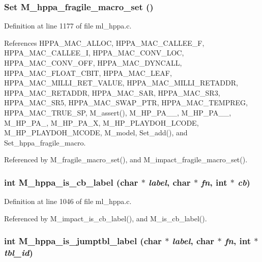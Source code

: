 \subsubsection{\setlength{\rightskip}{0pt plus 5cm}\bf{Set} M\_\-hppa\_\-fragile\_\-macro\_\-set ()}\label{ml__hppa_8c_edcedf3decd672a9794788983658d9de}




Definition at line 1177 of file ml\_\-hppa.c.

References HPPA\_\-MAC\_\-ALLOC, HPPA\_\-MAC\_\-CALLEE\_\-F, HPPA\_\-MAC\_\-CALLEE\_\-I, HPPA\_\-MAC\_\-CONV\_\-LOC, HPPA\_\-MAC\_\-CONV\_\-OFF, HPPA\_\-MAC\_\-DYNCALL, HPPA\_\-MAC\_\-FLOAT\_\-CBIT, HPPA\_\-MAC\_\-LEAF, HPPA\_\-MAC\_\-MILLI\_\-RET\_\-VALUE, HPPA\_\-MAC\_\-MILLI\_\-RETADDR, HPPA\_\-MAC\_\-RETADDR, HPPA\_\-MAC\_\-SAR, HPPA\_\-MAC\_\-SR3, HPPA\_\-MAC\_\-SR5, HPPA\_\-MAC\_\-SWAP\_\-PTR, HPPA\_\-MAC\_\-TEMPREG, HPPA\_\-MAC\_\-TRUE\_\-SP, M\_\-assert(), M\_\-HP\_\-PA\_\_, M\_\-HP\_\-PA\_\_, M\_\-HP\_\-PA\_, M\_\-HP\_\-PA\_\-X, M\_\-HP\_\-PLAYDOH\_\-LCODE, M\_\-HP\_\-PLAYDOH\_\-MCODE, M\_\-model, Set\_\-add(), and Set\_\-hppa\_\-fragile\_\-macro.

Referenced by M\_\-fragile\_\-macro\_\-set(), and M\_\-impact\_\-fragile\_\-macro\_\-set().
\subsubsection{\setlength{\rightskip}{0pt plus 5cm}int M\_\-hppa\_\-is\_\-cb\_\-label (char $\ast$ {\em label}, char $\ast$ {\em fn}, int $\ast$ {\em cb})}\label{ml__hppa_8c_b557b1da6cb9fe60c27045b59c76075e}




Definition at line 1046 of file ml\_\-hppa.c.

Referenced by M\_\-impact\_\-is\_\-cb\_\-label(), and M\_\-is\_\-cb\_\-label().
\subsubsection{\setlength{\rightskip}{0pt plus 5cm}int M\_\-hppa\_\-is\_\-jumptbl\_\-label (char $\ast$ {\em label}, char $\ast$ {\em fn}, int $\ast$ {\em tbl\_\-id})}\label{ml__hppa_8c_bba6c2e63f7c1343093c6d3b95cd1cd4}




